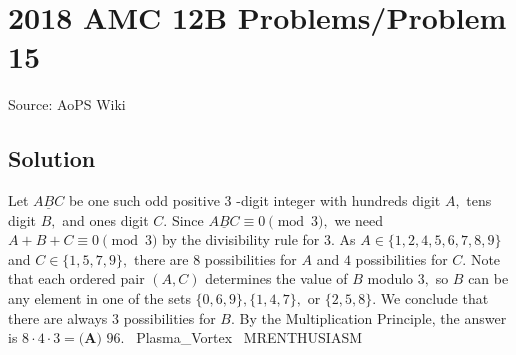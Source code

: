 \documentclass[12pt]{article}
\begin{document}
\section*{{2018 AMC 12B Problems/Problem 15}}
Source: AoPS Wiki

\subsection*{Solution}
Let $\underline{ABC}$ be one such odd positive $3$ -digit integer with hundreds digit $A,$ tens digit $B,$ and ones digit $C.$ Since $\underline{ABC}\equiv0\pmod3,$ we need $A+B+C\equiv0\pmod3$ by the divisibility rule for $3.$ As $A\in\{1,2,4,5,6,7,8,9\}$ and $C\in\{1,5,7,9\},$ there are $8$ possibilities for $A$ and $4$ possibilities for $C.$ Note that each ordered pair $(A,C)$ determines the value of $B$ modulo $3,$ so $B$ can be any element in one of the sets $\{0,6,9\},\{1,4,7\},$ or $\{2,5,8\}.$ We conclude that there are always $3$ possibilities for $B.$ By the Multiplication Principle, the answer is $8\cdot4\cdot3=\boxed{\textbf{(A) } 96}.$ ~Plasma_Vortex ~MRENTHUSIASM
\end{document}
